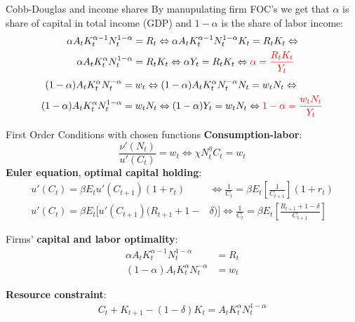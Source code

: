 \documentclass{beamer}
\newcommand{\trs}[1]{{\color{red}{#1}}}
\begin{document}
\begin{frame}{Cobb-Douglas and income shares}
    By manupulating firm FOC's we get that $\alpha$ is share of capital in total income (GDP) and $1-\alpha$ is the share of labor income: 
      \begin{align*}
	\alpha A_t K_t^{\alpha-1} N_t^{1-\alpha} &= R_t \Leftrightarrow \alpha A_t K_t^{\alpha-1} N_t^{1-\alpha}K_t  = R_t K_t \Leftrightarrow \\ 
	\alpha A_t K_t^{\alpha} N_t^{1-\alpha} &= R_t K_t \Leftrightarrow \alpha Y_t = R_t K_t \Leftrightarrow \trs{\alpha = \frac{R_t K_t}{Y_t}}  
 \end{align*}
 \begin{align*}
 (1-\alpha)A_t K_t^{\alpha}N_t^{-\alpha} &= w_t \Leftrightarrow (1-\alpha)A_t K_t^{\alpha}N_t^{-\alpha} N_t = w_t N_t \Leftrightarrow\\
 (1-\alpha)A_t K_t^{\alpha}N_t^{1-\alpha} &= w_t N_t \Leftrightarrow (1-\alpha)Y_t = w_t N_t \Leftrightarrow \trs{1-\alpha = \frac{w_t N_t}{Y_t}}
\end{align*}
\end{frame}
\begin{frame}{First Order Conditions with chosen functions}
\textbf{Consumption-labor}:
\begin{equation*}
\frac{\nu'(N_t)}{u'(C_t)}= w_t \Leftrightarrow \chi N_t^\eta C_t=w_t 
\end{equation*}
\textbf{Euler equation}, \textbf{optimal capital holding}:
\begin{align*}
u'(C_t) = \beta E_t u'(C_{t+1})(1+r_t) &\Leftrightarrow
  \frac{1}{C_t} =  \beta  E_t \left[\frac{1}{C_{t+1}}\right](1+r_t) \\
u'(C_t) = \beta E_t [u'(C_{t+1})(R_{t+1}+1-&\delta)] \Leftrightarrow \frac{1}{C_t} =  \beta  E_t \left[\frac{R_{t+1} + 1 - \delta}{C_{t+1}}\right]
\end{align*}
\vfill

Firms' \textbf{capital and labor optimality}: 
  \begin{align*}
	\alpha A_t K_t^{\alpha-1} N_t^{1-\alpha} &= R_t\\ (1-\alpha)A_t K_t^{\alpha}N_t^{-\alpha} &= w_t
\end{align*}

\textbf{Resource constraint}:
\begin{align*}
  C_t+K_{t+1}-(1-\delta)K_t= A_t K_t^\alpha N_t^{1-\alpha} 
\end{align*}
\end{frame}
\end{document}
